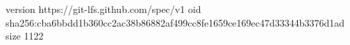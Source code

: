 version https://git-lfs.github.com/spec/v1
oid sha256:cba6bbdd1b360cc2ac38b86882af499cc8fe1659ce169ec47d33344b3376d1ad
size 1122
